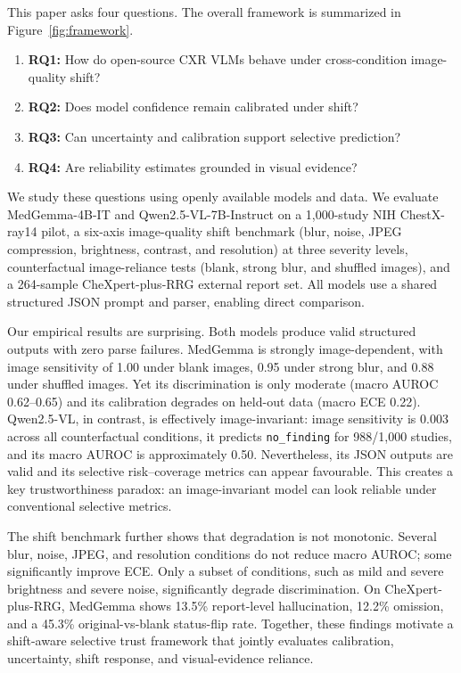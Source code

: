 This paper asks four questions. The overall framework is summarized in Figure~\ref{fig:framework}.

\begin{enumerate}
\item \textbf{RQ1:} How do open-source CXR VLMs behave under cross-condition image-quality shift?
\item \textbf{RQ2:} Does model confidence remain calibrated under shift?
\item \textbf{RQ3:} Can uncertainty and calibration support selective prediction?
\item \textbf{RQ4:} Are reliability estimates grounded in visual evidence?
\end{enumerate}

We study these questions using openly available models and data. We evaluate MedGemma-4B-IT and Qwen2.5-VL-7B-Instruct on a 1,000-study NIH ChestX-ray14 pilot, a six-axis image-quality shift benchmark (blur, noise, JPEG compression, brightness, contrast, and resolution) at three severity levels, counterfactual image-reliance tests (blank, strong blur, and shuffled images), and a 264-sample CheXpert-plus-RRG external report set. All models use a shared structured JSON prompt and parser, enabling direct comparison.

Our empirical results are surprising. Both models produce valid structured outputs with zero parse failures. MedGemma is strongly image-dependent, with image sensitivity of 1.00 under blank images, 0.95 under strong blur, and 0.88 under shuffled images. Yet its discrimination is only moderate (macro AUROC 0.62--0.65) and its calibration degrades on held-out data (macro ECE 0.22). Qwen2.5-VL, in contrast, is effectively image-invariant: image sensitivity is 0.003 across all counterfactual conditions, it predicts \texttt{no\_finding} for 988/1,000 studies, and its macro AUROC is approximately 0.50. Nevertheless, its JSON outputs are valid and its selective risk--coverage metrics can appear favourable. This creates a key trustworthiness paradox: an image-invariant model can look reliable under conventional selective metrics.

The shift benchmark further shows that degradation is not monotonic. Several blur, noise, JPEG, and resolution conditions do not reduce macro AUROC; some significantly improve ECE. Only a subset of conditions, such as mild and severe brightness and severe noise, significantly degrade discrimination. On CheXpert-plus-RRG, MedGemma shows 13.5\% report-level hallucination, 12.2\% omission, and a 45.3\% original-vs-blank status-flip rate. Together, these findings motivate a shift-aware selective trust framework that jointly evaluates calibration, uncertainty, shift response, and visual-evidence reliance.

